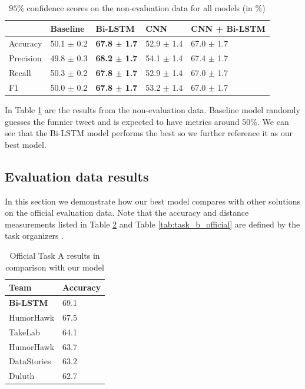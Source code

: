 \documentclass[10pt, a4paper]{article}
\begin{document}
\begin{table}
\scriptsize
    \caption{$95\%$ confidence scores on the non-evaluation data for all models
    (in $\%$)}
 \label{tab:conf_95_dev}
 \begin{center}
 \begin{tabular}{l|llll}
 \toprule
     & Baseline & Bi-LSTM & CNN & CNN + Bi-LSTM\\
 \midrule
     Accuracy & 50.1 $\pm$ 0.2 & \textbf{67.8 $\pm$ 1.7} & 52.9 $\pm$ 1.4  & 67.0 $\pm$
     1.7\\

     Precision & 49.8 $\pm$ 0.3 & \textbf{68.2 $\pm$ 1.7}  & 54.1 $\pm$ 1.4& 67.4 $\pm$ 1.7\\
     Recall & 50.3 $\pm$ 0.2 & \textbf{67.8 $\pm$ 1.7} & 52.9 $\pm$ 1.4& 67.0 $\pm$ 1.7\\

     F1 & 50.0 $\pm$ 0.2 & \textbf{67.8 $\pm$ 1.7}  & 53.2 $\pm$ 1.4 & 67.0 $\pm$ 1.7\\

 \bottomrule
 \end{tabular}
 \end{center}
\end{table}

In Table \ref{tab:conf_95_dev} are the results from the non-evaluation data.
Baseline model randomly guesses the funnier tweet and is expected to have
metrics around $50\%$. We can see that the Bi-LSTM model performs the best so
we further reference it as our best model.

\subsection{Evaluation data results}
In this section we demonstrate how our best model compares with other solutions on the official
evaluation data. Note that the accuracy and distance measurements listed in
Table \ref{tab:task_a_official} and Table \ref{tab:task_b_official} are
defined by the task organizers \citep{potash2016hashtagwars}.

\begin{table}
  \caption{Official Task A results in comparison with our model}
 \label{tab:task_a_official}
 \begin{center}
 \begin{tabular}{ll}
 \toprule
     Team & Accuracy\\
 \midrule
     \textbf{Bi-LSTM} & 69.1 \\
     HumorHawk & 67.5 \\
     TakeLab & 64.1\\
     HumorHawk & 63.7\\
     DataStories & 63.2\\
     Duluth & 62.7\\
 \bottomrule
 \end{tabular}
 \end{center}
\end{table}
\end{document}
